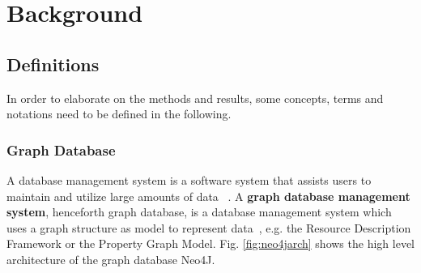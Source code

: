 \chapter{Background}\label{\positionnumber} 
\section{Definitions}\label{\positionnumber}
In order to elaborate on the methods and results, some concepts, terms and notations need to be defined in the following.
\subsection{Graph Database}\label{\positionnumber}
A database management system is a  software system that assists users to  maintain and utilize large amounts of data ~\cite{Ramakrishnan:2002:DMS:560733}.
A \textbf{graph database management system}, henceforth graph database, is a database management system which uses a graph structure as model to represent data~\cite{neo4j_book}, e.g. the Resource Description Framework or the Property Graph Model. Fig. \ref{fig:neo4jarch} shows the high level architecture of the graph database Neo4J. \\


